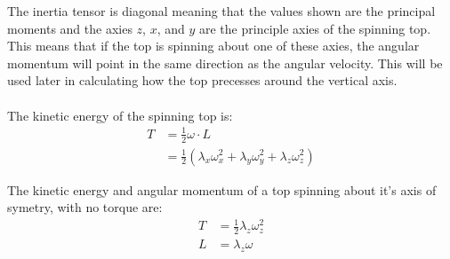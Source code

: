 \documentclass[a4paper,12pt]{article}
\begin{document}
The inertia tensor is diagonal meaning that the values shown are the principal moments and the axies $z$, $x$, and $y$ are the principle axies of the spinning top. This means that if the top is spinning about one of these axies, the angular momentum will point in the same direction as the angular velocity.  This will be used later in calculating how the top precesses around the vertical axis.\\
\\
The kinetic energy of the spinning top is:
\begin{align*}
T&=\frac{1}{2}\omega\cdot L\\
&=\frac{1}{2}(\lambda_x \omega_x^2+\lambda_y\omega_y^2+\lambda_z\omega_z^2)
\end{align*}

The kinetic energy and angular momentum of a top spinning about it's axis of symetry, with no torque are:
\begin{align*}
T&=\frac{1}{2}\lambda_z\omega_z^2\\
L&=\lambda_z\omega
\end{align*} 
\end{document}
